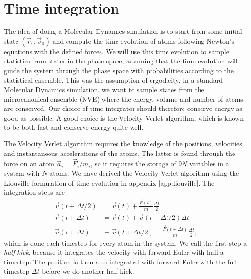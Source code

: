 \section{Time integration}
\label{sec:md_time_integration}
The idea of doing a Molecular Dynamics simulation is to start from some initial state $(\vec r_0, \vec v_0)$ and compute the time evolution of atoms following Newton's equations with the defined forces. We will use this time evolution to sample statistics from states in the phase space, assuming that the time evolution will guide the system through the phase space with probabilities according to the statistical ensemble. This was the assumption of ergodicity. In a standard Molecular Dynamics simulation, we want to sample states from the microcanonical ensemble (NVE) where the energy, volume and number of atoms are conserved. Our choice of time integrator should therefore conserve energy as good as possible. A good choice is the Velocity Verlet algorithm, which is known to be both fast and conserve energy quite well\cite{frenkel2001understanding}.

The Velocity Verlet algorithm requires the knowledge of the positions, velocities and instantaneous accelerations of the atoms. The latter is found through the force on an atom $\vec a_i = \vec F_i/m_i$, so it requires the storage of $9N$ variables in a system with $N$ atoms. We have derived the Velocity Verlet algorithm using the Liouville formulation of time evolution in appendix \ref{app:liouville}. The integration steps are
\begin{align}
	\vec v(t + \Delta t/2) &= \vec v(t) + \frac{\vec F(t)}{m}\frac{\Delta t}{2}\\
	\vec r(t + \Delta t) &= \vec r(t) + \vec v(t + \Delta t/2)\Delta t\\
	\vec v(t + \Delta t) &= \vec v(t + \Delta t/2) + \frac{\vec F(t + \Delta t)}{m}\frac{\Delta t}{2},
\end{align}
which is done each timestep for every atom in the system. We call the first step a \textit{half kick}, because it integrates the velocity with forward Euler with half a timestep. The position is then also integrated with forward Euler with the full timestep $\Delta t$ before we do another half kick.